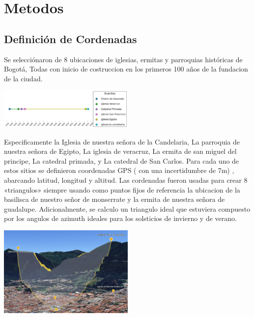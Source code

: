 \documentclass[a4paper,alpha-refs]{eSpectra}
\begin{document}
\vspace{-\baselineskip}  %
\justifying
\section{Metodos}

\subsection{Definición de Cordenadas}
\justifying
Se selecciónaron de 8 ubicaciones  de iglesias, ermitas y parroquias  históricas de Bogotá, Todas con inicio de costruccion en los primeros 100 años de la fundacion de la ciudad.

\centering
   \includegraphics[width=0.5\textwidth]{images/timeline_events.png}
\smallskip

\justifying
Especificamente  la Iglesia de nuestra señora de la Candelaria, La parroquia de nuestra señora de Egipto, La iglesia de veracruz, La ermita de san miguel del principe, La catedral primada, y La catedral de San Carlos. 
Para cada uno de estos sitios se definieron coordenadas  GPS ( con una incertidumbre de 7m) , abarcando latitud, longitud y altitud. Las cordenadas fueron usadas para crear 8 «triangulos» siempre usando como puntos fijos de referencia la ubicacion de la basilisca de nuestro señor de monserrate y la ermita de nuestra señora de guadalupe. Adicionalmente, se calculo un triangulo ideal que estuviera compuesto por los angulos de azimuth ideales para los solsticios de invierno y de verano.

\centering
   \includegraphics[width=0.5\textwidth]{images/Pasted image 20250617164513.png}
\justifying
\end{document}
